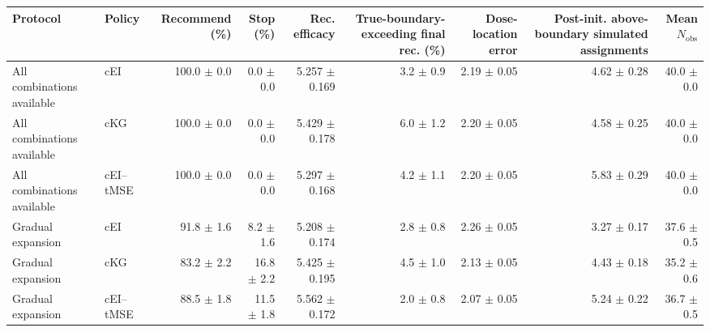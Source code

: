 \begin{tabular}{llrrrrrrr}
\toprule
Protocol & Policy & Recommend (\%) & Stop (\%) & Rec. efficacy & True-boundary-exceeding final rec. (\%) & Dose-location error & Post-init. above-boundary simulated assignments & Mean $N_{\mathrm{obs}}$ \\
\midrule
All combinations available & cEI & 100.0 $\pm$ 0.0 & 0.0 $\pm$ 0.0 & 5.257 $\pm$ 0.169 & 3.2 $\pm$ 0.9 & 2.19 $\pm$ 0.05 & 4.62 $\pm$ 0.28 & 40.0 $\pm$ 0.0 \\
All combinations available & cKG & 100.0 $\pm$ 0.0 & 0.0 $\pm$ 0.0 & 5.429 $\pm$ 0.178 & 6.0 $\pm$ 1.2 & 2.20 $\pm$ 0.05 & 4.58 $\pm$ 0.25 & 40.0 $\pm$ 0.0 \\
All combinations available & cEI--tMSE & 100.0 $\pm$ 0.0 & 0.0 $\pm$ 0.0 & 5.297 $\pm$ 0.168 & 4.2 $\pm$ 1.1 & 2.20 $\pm$ 0.05 & 5.83 $\pm$ 0.29 & 40.0 $\pm$ 0.0 \\
\addlinespace
Gradual expansion & cEI & 91.8 $\pm$ 1.6 & 8.2 $\pm$ 1.6 & 5.208 $\pm$ 0.174 & 2.8 $\pm$ 0.8 & 2.26 $\pm$ 0.05 & 3.27 $\pm$ 0.17 & 37.6 $\pm$ 0.5 \\
Gradual expansion & cKG & 83.2 $\pm$ 2.2 & 16.8 $\pm$ 2.2 & 5.425 $\pm$ 0.195 & 4.5 $\pm$ 1.0 & 2.13 $\pm$ 0.05 & 4.43 $\pm$ 0.18 & 35.2 $\pm$ 0.6 \\
Gradual expansion & cEI--tMSE & 88.5 $\pm$ 1.8 & 11.5 $\pm$ 1.8 & 5.562 $\pm$ 0.172 & 2.0 $\pm$ 0.8 & 2.07 $\pm$ 0.05 & 5.24 $\pm$ 0.22 & 36.7 $\pm$ 0.5 \\
\bottomrule
\end{tabular}
